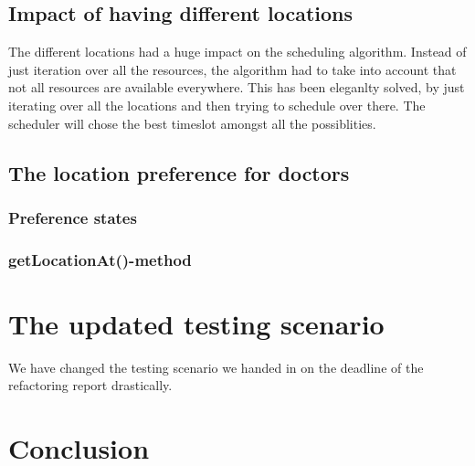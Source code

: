 \documentclass[12pt]{article}
\begin{document}
\subsection{Impact of having different locations}
The different locations had a huge impact on the scheduling algorithm. Instead of just iteration over all the resources, the algorithm had to take into account that not all resources are available everywhere. This has been eleganlty solved, by just iterating over all the locations and then trying to schedule over there. The scheduler will chose the best timeslot amongst all the possiblities.
\subsection{The location preference for doctors}
\subsubsection{Preference states}
\subsubsection{getLocationAt()-method}

\section{The updated testing scenario}
We have changed the testing scenario we handed in on the deadline of the refactoring report drastically.
\section{Conclusion}
\end{document}
